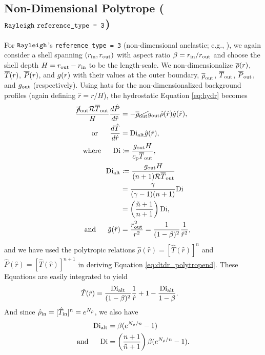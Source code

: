 \documentclass[12pt]{article}
\numberwithin{equation}{section}
\newcommand{\dialt}{\di_{\rm{alt}}}
\begin{document}
\subsection{Non-Dimensional Polytrope ($\texttt{Rayleigh}\ \texttt{reference\_type = 3}$)} 
For $\texttt{Rayleigh}$'s \texttt{reference\_type = 3} (non-dimensional anelastic; e.g., \citealt{Heimpel2022}), we again consider a shell spanning $(r_{\rm{in}}, r_{\rm{out}})$ with aspect ratio $\beta=r_{\rm{in}}/r_{\rm{out}}$ and choose the shell depth $H=r_{\rm{out}}-r_{\rm{in}}$ to be the length-scale. We non-dimensionalize $\overline{\rho}(r)$, $\overline{T}(r)$, $\overline{P}(r)$, and $g(r)$ with their values at the outer boundary, $\overline{\rho}_{\rm{out}}$, $\overline{T}_{\rm{out}}$, $\overline{P}_{\rm{out}}$, and $g_{\rm{out}}$ (respectively). Using hats for the non-dimensionalized background profiles (again defining $\hat{r}=r/H$), the hydrostatic Equation \eqref{eq:hydr} becomes
\begin{subequations}
\begin{align}
	\frac{\cancel{\rhoref}\out\gasconst\tmpref\out}{H}\frac{d\hat{P}}{d\hat{r}} &= -\cancel{\rhoref\out}g\out\hat{\rho}(\hat{r})\hat{g}(\hat{r}),
	\\
	\orr \frac{d\hat{T}}{d\hat{r}} &= \dialt\hat{g}(\hat{r})\label{eq:dtdr_polytropend},
	\\
	\where \di &\define \frac{g\out H}{\cp\tmpref\out},
	\\
	\dialt &\define \frac{g\out H}{(n+1)\gasconst \tmpref\out} \nonumber\\
	&= \frac{\gamma}{(\gamma-1)(n+1)}\di \nonumber\\
	&= \left( \frac{\tilde{n}+1}{n+1} \right) \di,
	\\
	\andd \hat{g}(\hat{r}) &= \frac{r\out^2}{r^2} = \frac{1}{(1-\beta)^2}\frac{1}{\hat{r}^2},
\end{align}
\end{subequations}
and we have used the polytropic relations $\hat{\rho}(\hat{r})=[\hat{T}(\hat{r})]^n$ and $\hat{P}(\hat{r})=[\hat{T}(\hat{r})]^{n+1}$ in deriving Equation \eqref{eq:dtdr_polytropend}. These Equations are easily integrated to yield
\begin{align}
	\hat{T}(\hat{r}) &= \frac{\dialt}{(1-\beta)^2}\frac{1}{\hat{r}} + 1 - \frac{\dialt}{1-\beta}.
\end{align}
And since $\hat{\rho}_{\rm{in}} = [\hat{T}_{\rm{in}}]^n = e^{N_\rho}$, we also have 
\begin{subequations}
\begin{align}
	\dialt &= \beta (e^{\nrho/n} - 1)\\
	\andd \di &= \left( \frac{n+1}{\tilde{n}+1} \right)\beta (e^{\nrho/n} - 1).
\end{align}
\end{subequations}
\end{document}
